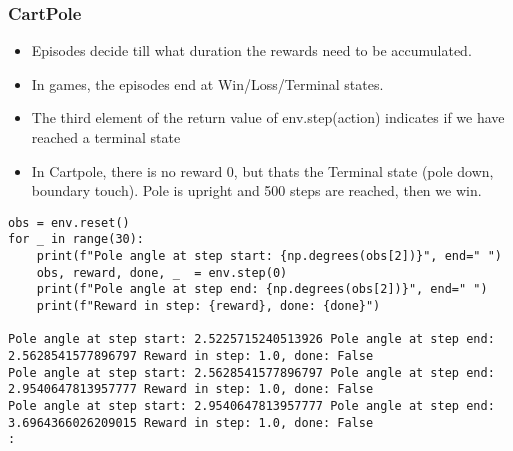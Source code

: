 \begin{frame}[fragile]\frametitle{CartPole}

\begin{itemize}
\item Episodes decide till what duration the rewards need to be accumulated.
\item In games, the episodes end at Win/Loss/Terminal states.
\item The third element of the return value of env.step(action) indicates if we have reached a terminal state
\item In Cartpole, there is no reward 0, but thats the Terminal state (pole down, boundary touch). Pole is upright and 500 steps are reached, then we win.
\end{itemize}

\begin{lstlisting}
obs = env.reset()
for _ in range(30):
    print(f"Pole angle at step start: {np.degrees(obs[2])}", end=" ")
    obs, reward, done, _  = env.step(0)
    print(f"Pole angle at step end: {np.degrees(obs[2])}", end=" ")
    print(f"Reward in step: {reward}, done: {done}")
		
Pole angle at step start: 2.5225715240513926 Pole angle at step end: 2.5628541577896797 Reward in step: 1.0, done: False
Pole angle at step start: 2.5628541577896797 Pole angle at step end: 2.9540647813957777 Reward in step: 1.0, done: False
Pole angle at step start: 2.9540647813957777 Pole angle at step end: 3.6964366026209015 Reward in step: 1.0, done: False
:		
\end{lstlisting}


\end{frame}

